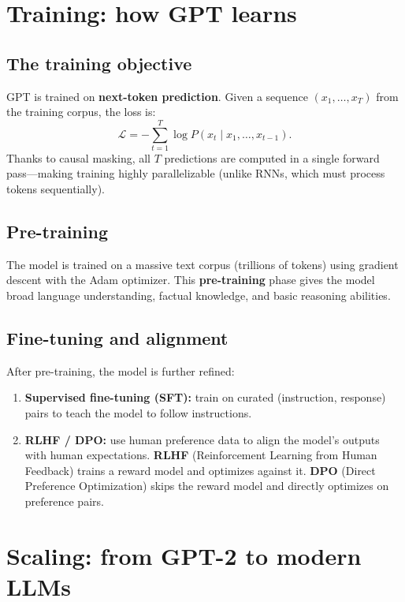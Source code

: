 \documentclass[11pt, twoside, openright]{memoir}
\begin{document}
\section{Training: how GPT learns}

\subsection{The training objective}

GPT is trained on \textbf{next-token prediction}.  Given a sequence
$(x_1, \ldots, x_T)$ from the training corpus, the loss is:
\[
  \mathcal{L} = -\sum_{t=1}^{T} \log P(x_t \mid x_1, \ldots, x_{t-1}).
\]
Thanks to causal masking, all $T$ predictions are computed in a single
forward pass---making training highly parallelizable (unlike RNNs, which
must process tokens sequentially).

\subsection{Pre-training}

The model is trained on a massive text corpus (trillions of tokens) using
gradient descent with the Adam optimizer.  This \textbf{pre-training} phase
gives the model broad language understanding, factual knowledge, and basic
reasoning abilities.

\subsection{Fine-tuning and alignment}

After pre-training, the model is further refined:
\begin{enumerate}[nosep]
\item \textbf{Supervised fine-tuning (SFT):} train on curated
  (instruction, response) pairs to teach the model to follow instructions.
\item \textbf{RLHF / DPO:} use human preference data to align the model's
  outputs with human expectations.  \textbf{RLHF} (Reinforcement Learning
  from Human Feedback) trains a reward model and optimizes against it.
  \textbf{DPO} (Direct Preference Optimization) skips the reward model
  and directly optimizes on preference pairs.
\end{enumerate}

\section{Scaling: from GPT-2 to modern LLMs}
\end{document}
